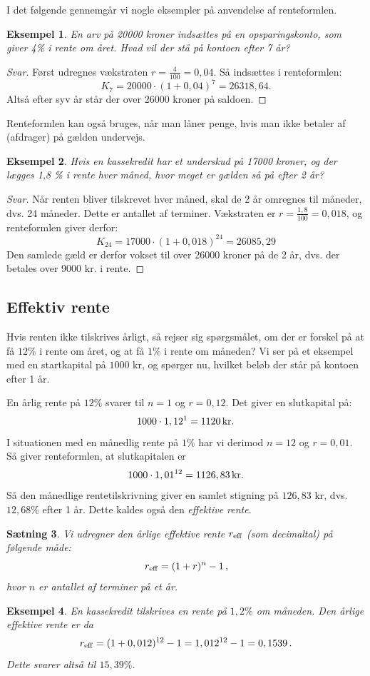 \documentclass[12pt,oneside,a4paper]{article}
\newtheorem{thm}{Sætning}[section]
\newtheorem{eks}[thm]{Eksempel}
\begin{document}
I det følgende gennemgår vi nogle eksempler på anvendelse af renteformlen.
\begin{eks}
    En arv på 20000 kroner indsættes på en opsparingskonto, som
    giver 4\% i rente om året. Hvad vil der stå på kontoen efter 7 år?
\end{eks}
\begin{proof}[Svar]
    Først udregnes vækstraten $r=\frac{4}{100} = 0,04$. Så indsættes i renteformlen:
    $$
    K_7 = 20000 \cdot (1 + 0,04)^7 = 26318,64.
    $$
    Altså efter syv år står der over 26000 kroner på saldoen.
\end{proof}

Renteformlen kan også bruges, når man låner penge, hvis man ikke betaler af
(afdrager) på gælden undervejs.
\begin{eks}
    Hvis en kassekredit har et underskud på 17000 kroner, og der
    lægges 1,8 \% i rente hver måned, hvor meget er gælden så på efter 2 år?
\end{eks}
\begin{proof}[Svar]
    Når renten bliver tilskrevet hver måned, skal de 2 år omregnes til
    måneder, dvs. 24 måneder. Dette er antallet af terminer. Vækstraten er $r =
    \frac{1,8}{100} = 0,018$, og renteformlen giver derfor:
    $$
    K_{24} = 17000 \cdot (1 + 0,018)^{24} = 26085,29
    $$
    Den samlede gæld er derfor vokset til over 26000 kroner på de 2 år, dvs.
    der betales over 9000 kr. i rente.
\end{proof}

\subsection*{Effektiv rente}
Hvis renten ikke tilskrives årligt, så rejser sig spørgsmålet, om der er
forskel på at få $12\%$ i rente om året, og at få $1\%$ i rente om måneden?  Vi
ser på et eksempel med en startkapital på $1000$ kr, og spørger nu, hvilket
beløb der står på kontoen efter 1 år.

En årlig rente på $12\%$ svarer til $n=1$ og $r=0,12$. Det giver en slutkapital
på:
\[
    1000 \cdot 1,12^1 = 1120 {\,\rm kr.}
\]
I situationen med en månedlig rente på $1\%$ har vi derimod $n=12$ og $r=0,01$.
Så giver renteformlen, at slutkapitalen er
\[
    1000\cdot 1,01^{12} = 1126,83 {\,\rm kr.}
\]
Så den månedlige rentetilskrivning giver en samlet stigning på $126,83$ kr, dvs.
$12,68\%$ efter 1 år. Dette kaldes også den {\em effektive rente}.
\begin{thm}
    Vi udregner den årlige effektive rente $r_{\rm eff}$ (som decimaltal) på
    følgende måde:
    \[
        r_{\rm eff} = (1+r)^n-1\,,
    \]
hvor $n$ er antallet af terminer på et år.
\end{thm}
\begin{eks}
    En kassekredit tilskrives en rente på $1,2\%$ om måneden. Den årlige
    effektive rente er da
    \[
        r_{\rm eff} = (1+0,012)^{12}-1 = 1,012^{12}-1 = 0,1539\,.
    \]
    Dette svarer altså til $15,39\%$.
\end{eks}
\end{document}
